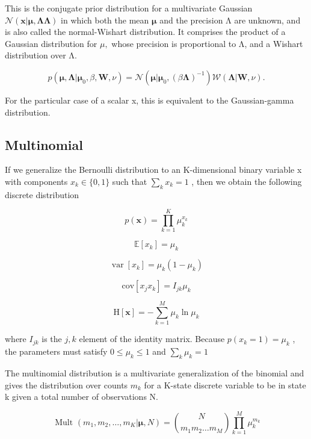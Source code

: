 \documentclass[
  10
]{article}
\begin{document}
This is the conjugate prior distribution for a multivariate Gaussian
\(\mathcal { N } ( \mathbf { x } | \boldsymbol { \mu } , \mathbf { \Lambda } \mathbf { \Lambda } )\)
in which both the mean \(\pmb { \mu }\) and the precision Λ are unknown,
and is also called the normal-Wishart distribution. It comprises the
product of a Gaussian distribution for \(\mu ,\) whose precision is
proportional to Λ, and a Wishart distribution over Λ.

\[
p (\boldsymbol {\mu}, \boldsymbol {\Lambda} | \boldsymbol {\mu} _ {0}, \beta , \mathbf {W}, \nu) = \mathcal {N} \left(\boldsymbol {\mu} | \boldsymbol {\mu} _ {0}, (\beta \boldsymbol {\Lambda}) ^ {- 1}\right) \mathcal {W} (\boldsymbol {\Lambda} | \mathbf {W}, \nu).\tag{B.53}
\]

For the particular case of a scalar x, this is equivalent to the
Gaussian-gamma distribution.

\subsection{Multinomial}\label{multinomial}

If we generalize the Bernoulli distribution to an K-dimensional binary
variable x with components \(x _ { k } \in \{ 0 , 1 \}\) such that
\(\textstyle \sum _ { k } x _ { k } = 1\) , then we obtain the following
discrete distribution

\[
p (\mathbf {x}) = \prod_ {k = 1} ^ {K} \mu_ {k} ^ {x _ {k}}\tag{B.54}
\]

\[
\mathbb {E} [ x _ {k} ] = \mu_ {k}\tag{B.55}
\]

\[
\operatorname{var} [ x _ {k} ] = \mu_ {k} (1 - \mu_ {k})\tag{B.56}
\]

\[
{\mathrm{cov} [ x _ {j} x _ {k} ]} = {I _ {j k} \mu_ {k}}\tag{B.57}
\]

\[
\mathrm{H} [ \mathbf {x} ] = - \sum_ {k = 1} ^ {M} \mu_ {k} \ln \mu_ {k}\tag{B.58}
\]

where \(I _ { j k }\) is the \(j , k\) element of the identity matrix.
Because \(p ( x _ { k } = 1 ) = \mu _ { k }\) , the parameters must
satisfy \(0 \leqslant \mu _ { k } \leqslant 1\) and
\(\textstyle \sum _ { k } \mu _ { k } = 1\)

The multinomial distribution is a multivariate generalization of the
binomial and gives the distribution over counts \(m _ { k }\) for a
K-state discrete variable to be in state k given a total number of
observations N.

\[
\text { Mult } (m _ {1}, m _ {2}, \ldots , m _ {K} | \boldsymbol {\mu}, N) = \binom{N}{m _ {1} m _ {2} \ldots m _ {M}} \prod_ {k = 1} ^ {M} \mu_ {k} ^ {m _ {k}}\tag{B.59}
\]
\end{document}
